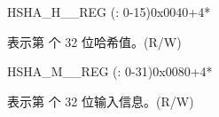 \begin{register}{H}{SHA\_H\_\_REG (: 0-15)}{0x0040+4*}\label{regdesc:SHAHNREG}
%
\regnewline%
\begin{regdesc}\begin{reglist}
\label{fielddesc:SHAH0}\item [SHA\_H\_\regindex{n}] 表示第  个 32 位哈希值。(R/W)
\end{reglist}\end{regdesc}
\end{register}

\begin{register}{H}{SHA\_M\_\_REG (: 0-31)}{0x0080+4*}\label{regdesc:SHAMNREG}
%
\regnewline%
\begin{regdesc}\begin{reglist}
\label{fielddesc:SHAM0}\item [SHA\_M\_\regindex{n}] 表示第  个 32 位输入信息。(R/W)
\end{reglist}\end{regdesc}
\end{register}
